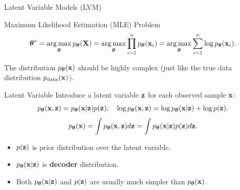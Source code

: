 \documentclass{beamer}
\renewcommand{\eqpause}{}
\renewcommand{\nextonslide}[1]{#1}
\begin{document}
\begin{frame}{Latent Variable Models (LVM)}
	\begin{block}{Maximum Likelihood Estimation (MLE) Problem}
		\vspace{-0.7cm}
		\[
			\boldsymbol{\theta}^* = \operatorname*{arg\,max}_{\boldsymbol{\theta}} p_{\boldsymbol{\theta}}(\mathbf{X}) = \operatorname*{arg\,max}_{\boldsymbol{\theta}} \prod_{i=1}^n p_{\boldsymbol{\theta}}(\mathbf{x}_i) = \operatorname*{arg\,max}_{\boldsymbol{\theta}} \sum_{i=1}^n \log p_{\boldsymbol{\theta}}(\mathbf{x}_i).
		\]
		\vspace{-0.5cm}
	\end{block}
    \eqpause
	The distribution $p_{\boldsymbol{\theta}}(\mathbf{x})$ should be highly complex (just like the true data distribution $p_{\text{data}}(\mathbf{x})$).
    \eqpause
	\begin{block}{Latent Variable}
		Introduce a latent variable $\mathbf{z}$ for each observed sample $\mathbf{x}$:
		\[
			p_{\boldsymbol{\theta}}(\mathbf{x}, \mathbf{z}) = p_{\boldsymbol{\theta}}(\mathbf{x} | \mathbf{z}) p(\mathbf{z}); \quad 
		\log p_{\boldsymbol{\theta}}(\mathbf{x}, \mathbf{z}) = \log p_{\boldsymbol{\theta}}(\mathbf{x} | \mathbf{z}) + \log p(\mathbf{z}).
		\]
		\[
			\nextonslide{\pt(\bx) = \int \pt(\bx, \bz) d\bz = \int \pt(\bx | \bz) p(\bz) d\bz.}
		\]
	\end{block}
    \eqpause
	\vspace{-0.3cm}
	\begin{itemize}
		\item $p(\mathbf{z})$ is prior distribution over the latent variable.
		\item $p_{\boldsymbol{\theta}}(\mathbf{x} | \mathbf{z})$ is \textbf{decoder} distribution.
		\item Both $p_{\boldsymbol{\theta}}(\mathbf{x} | \mathbf{z})$ and $p(\mathbf{z})$ are usually much simpler than $p_{\boldsymbol{\theta}}(\mathbf{x})$.
	\end{itemize}
\end{frame}
\end{document}
